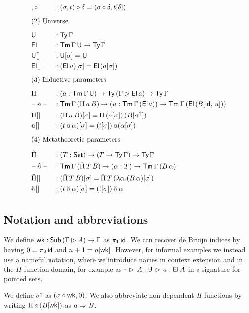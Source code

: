 \documentclass[a4paper,UKenglish,cleveref, autoref]{lipics-v2019}
\begin{document}
\begin{alignat*}{5}
  & {,\circ} && : (\sigma, t)\circ\delta = (\sigma\circ\delta, t[\delta]) \\[0.5em]
  & \rlap{(2) Universe} \\[0.5em]
  & \U && : \Ty\,\Gamma \\
  & \El && : \Tm\,\Gamma\,\U\ra\Ty\,\Gamma \\
  & {\U[]} && : \U[\sigma] = \U \\
  & {\El[]} && : (\El\,a)[\sigma] = \El\,(a[\sigma]) \\[0.5em]
  & \rlap{(3) Inductive parameters} \\[0.5em]
  & \Pi && : (a:\Tm\,\Gamma\,\U)\ra\Ty\,(\Gamma\ext\El\,a)\ra\Ty\,\Gamma \\
  & \blank\oldapp\blank && : \Tm\,\Gamma\,(\Pi\,a\,B)\ra (u : \Tm\,\Gamma\,(\El\,a))
  \ra \Tm\,\Gamma\,(\El\,(B[\id,\,u])) \\
  & {\Pi[]} && : (\Pi\,a\,B)[\sigma] = \Pi\,(a[\sigma])\,(B[\sigma^\uparrow]) \\
  & {\oldapp[]} && : (t\oldapp\alpha)[\sigma] = (t[\sigma])\mathop{\oldapp}(\alpha[\sigma]) \\[0.5em]
  & \rlap{(4) Metatheoretic parameters} \\[0.5em]
  & \Pim && : (T:\Set)\ra(T\ra\Ty\,\Gamma)\ra\Ty\,\Gamma \\
  & \blank\appm \blank && : \Tm\,\Gamma\,(\Pim\,T\,B)\ra(\alpha:T) \ra\Tm\,\Gamma\,(B\,\alpha) \\
  & {\Pim[]} && : (\Pim\,T\,B)[\sigma] = \Pim\,T\,(\lambda \alpha.(B\,\alpha)[\sigma]) \\
  & {\appm[]} && : (t\appm\alpha)[\sigma] = (t[\sigma])\mathop{\appm}\alpha \\[0.5em]
\end{alignat*}
\subsection{Notation and abbreviations}

We define $\mathsf{wk} : \mathsf{Sub}\,(\Gamma\rhd A)\rightarrow \Gamma$ as $\pi_1\,\mathsf{id}$.
We can recover de Bruijn indices by having $0= \pi_2 \,\mathsf{id}$ and $n+1 = n[\mathsf{wk}]$.
However, for informal examples we instead
use a nameful notation, where we introduce names in context extension and in the
$\Pi$ function domain, for example as $\boldsymbol{\cdot}\,\rhd\,A : \mathsf{U}\,\rhd\,a :
\mathsf{El}\,A$ in a signature for pointed sets.

We define $\sigma^\uparrow$ as $(\sigma\circ\mathsf{wk},0)$.
We also abbreviate non-dependent $\Pi$ functions by writing $\Pi\,a\,(B[\mathsf{wk}])$ as $a\Rightarrow B$.
\end{document}
